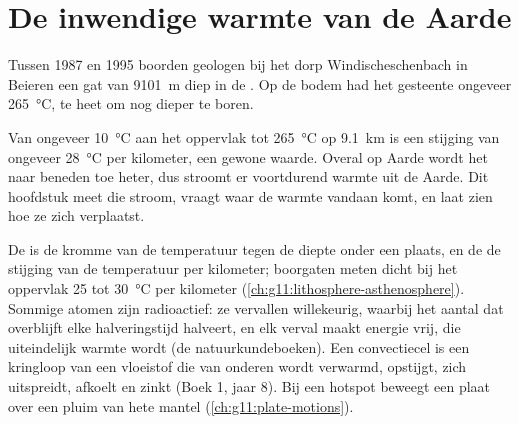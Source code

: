 \chapter{De inwendige warmte van de Aarde}\label{ch:g12:internal-heat}

Tussen 1987 en 1995 boorden geologen bij het dorp Windischeschenbach in Beieren
een gat van \qty{9101}{m} diep in de . Op de
bodem had het gesteente ongeveer \qty{265}{\celsius}, te heet om nog
dieper te boren.

Van ongeveer \qty{10}{\celsius} aan het oppervlak tot \qty{265}{\celsius} op
\qty{9.1}{km} is een stijging van ongeveer \qty{28}{\celsius} per kilometer, een gewone
waarde. Overal op Aarde wordt het naar beneden toe heter, dus stroomt er voortdurend warmte uit
de Aarde. Dit hoofdstuk meet die stroom, vraagt waar de warmte
vandaan komt, en laat zien hoe ze zich verplaatst.

\begin{recall}
De  is de kromme van de temperatuur tegen de diepte onder een plaats, en
de  de stijging van de temperatuur per kilometer; boorgaten
meten dicht bij het oppervlak 25 tot \qty{30}{\celsius} per kilometer
(\cref{ch:g11:lithosphere-asthenosphere}). Sommige atomen zijn radioactief: ze
vervallen willekeurig, waarbij het aantal dat overblijft elke halveringstijd halveert, en elk
verval maakt energie vrij, die uiteindelijk warmte wordt (de natuurkundeboeken). Een
convectiecel is een kringloop van een vloeistof die van onderen wordt verwarmd, opstijgt, zich uitspreidt,
afkoelt en zinkt (Boek 1, jaar 8). Bij een hotspot beweegt een plaat over een pluim
van hete mantel (\cref{ch:g11:plate-motions}).
\end{recall}

